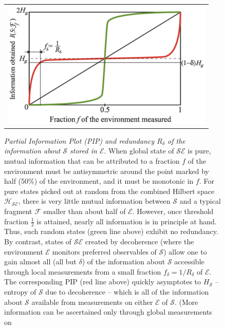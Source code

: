 \documentclass[aps,rmp,floatfix,11pt]{revtex4}
\def\FCW{4in}
\newcommand{\cH}        {{\mathcal H}}
\newcommand{\cS}        {{\mathcal S}}
\newcommand{\cE}        {{\mathcal E}}
\newcommand{\+}         {\dagger}
\newcommand\cF{{\mathcal F}}
\begin{document}
\begin{figure}[tb]
\begin{tabular}{l}
\vspace{-0.15in} \includegraphics[width=\FCW]{pips1B.pdf}\\
\end{tabular}
\caption{\emph{Partial Information Plot (PIP) and redundancy $R_\delta$ of the information 
about $\cS$ stored in $\cE$}.  When global state of $\cS\cE$ is pure, mutual information that can be 
attributed to a fraction $f$ of the environment must be antisymmetric around the point marked by half 
(50\%) of the environment, and it must be monotonic in $f$. For pure states picked out at random from 
the combined Hilbert space $\cH_{\cS\cE}$, there is very little mutual information between $\cS$ and 
a typical fragment $\cF$ smaller than about half of $\cE$. However, once threshold fraction $\frac 1 2$ 
is attained, nearly all information is in principle at hand. Thus, such random states (green line above)
exhibit no redundancy. By contrast, states of $\cS\cE$ created by decoherence (where the environment $\cE$ monitors preferred observables of $\cS$) allow one to gain almost all (all but $\delta$) of the information about $\cS$ accessible through local measurements from a small fraction $f_\delta=1/R_\delta$ of $\cE$. The corresponding PIP (red line above) quickly asymptotes to $H_\cS$ -- entropy 
of $\cS$ due to decoherence -- which is all of the information about $\cS$ available from measurements
on either $\cE$ of $\cS$. (More information can be ascertained only through global measurements on 
}
\end{figure}
\end{document}
